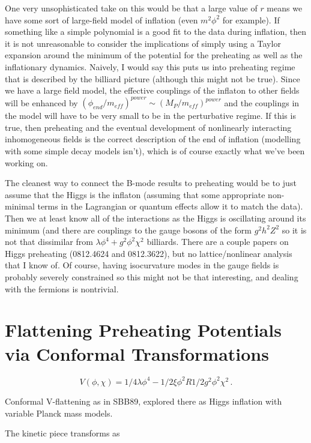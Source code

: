 \documentclass[11pt]{article}
\begin{document}
One very unsophisticated take on this would be that a large value of $r$
means we have some sort of large-field model of inflation (even $m^2\phi^2$
for example).
If something like a simple polynomial is a good fit to the data during
inflation, then it is not unreasonable to consider the implications of
simply using a Taylor expansion around the minimum of the potential for the
preheating as well as the inflationary dynamics.
Naively, I would say this puts us into preheating regime that is described
by the billiard picture (although this might not be true).
Since we have a large field model, the effective couplings of the inflaton
to other fields will be enhanced by $(\phi_{end}/m_{eff})^{power} \sim
(M_P/m_{eff})^{power}$ and the couplings in the model will have to be very
small to be in the perturbative regime.
If this is true, then preheating and the eventual development of
nonlinearly interacting inhomogeneous fields is the correct description of
the end of inflation (modelling with some simple decay models isn't), which
is of course exactly what we've been working on.

The cleanest way to connect the B-mode results to preheating would be to
just assume that the Higgs is the inflaton (assuming that some appropriate
non-minimal terms in the Lagrangian or quantum effects allow it to match
the data).
Then we at least know all of the interactions as the Higgs is oscillating
around its minimum (and there are couplings to the gauge bosons of the form
$g^2h^2Z^2$ so it is not that dissimilar from $\lambda\phi^4 +
g^2\phi^2\chi^2$ billiards.
There are a couple papers on Higgs preheating (0812.4624 and 0812.3622),
but no lattice/nonlinear analysis that I know of.
Of course, having isocurvature modes in the gauge fields is probably
severely constrained so this might not be that interesting, and dealing
with the fermions is nontrivial.


\section{Flattening Preheating Potentials via Conformal Transformations}

\begin{equation} V(\phi, \chi) = 1/4 \lambda \phi^4  - 1/2 \xi \phi^2 R  1/2 g^2 \phi^2 \chi^2 \, .
\end{equation}

Conformal V-flattening as in SBB89, explored there as Higgs inflation with variable Planck mass models. 

The kinetic piece transforms as 
\end{document}
